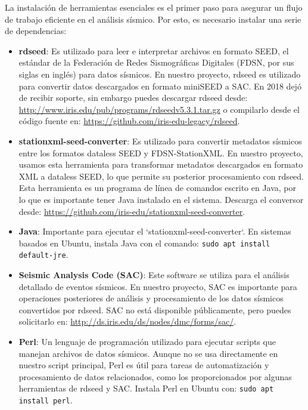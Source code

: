 \documentclass[a4paper,11pt]{refart}
\begin{document}
La instalación de herramientas esenciales es el primer paso para asegurar un flujo de trabajo eficiente en el análisis sísmico. Por esto, es necesario instalar una serie de dependencias:

\begin{itemize}
  \item \textbf{rdseed}: Es utilizado para leer e interpretar archivos en formato SEED, el estándar de la Federación de Redes Sismográficas Digitales (FDSN, por sus siglas en inglés) para datos sísmicos. En nuestro proyecto, rdseed es utilizado para convertir datos descargados en formato miniSEED a SAC. En 2018 dejó de recibir soporte, sin embargo puedes descargar rdseed desde: \url{http://www.iris.edu/pub/programs/rdseedv5.3.1.tar.gz} o compilarlo desde el código fuente en: \url{https://github.com/iris-edu-legacy/rdseed}.

  \item \textbf{stationxml-seed-converter}: Es utilizado para convertir metadatos sísmicos entre los formatos dataless SEED y FDSN-StationXML. En nuestro proyecto, usamos esta herramienta para transformar metadatos descargados en formato XML a dataless SEED, lo que permite su posterior procesamiento con rdseed. Esta herramienta es un programa de línea de comandos escrito en Java, por lo que es importante tener Java instalado en el sistema. Descarga el conversor desde: \url{https://github.com/iris-edu/stationxml-seed-converter}.

  \item \textbf{Java}: Importante para ejecutar el `stationxml-seed-converter`. En sistemas basados en Ubuntu, instala Java con el comando: \texttt{sudo apt install default-jre}.

  \item \textbf{Seismic Analysis Code (SAC)}: Este software se utiliza para el análisis detallado de eventos sísmicos. En nuestro proyecto, SAC es importante para operaciones posteriores de análisis y procesamiento de los datos sísmicos convertidos por rdseed. SAC no está disponible públicamente, pero puedes solicitarlo en: \url{http://ds.iris.edu/ds/nodes/dmc/forms/sac/}.

  \item \textbf{Perl}: Un lenguaje de programación utilizado para ejecutar scripts que manejan archivos de datos sísmicos. Aunque no se usa directamente en nuestro script principal, Perl es útil para tareas de automatización y procesamiento de datos relacionados, como los proporcionados por algunas herramientas de rdseed y SAC. Instala Perl en Ubuntu con: \texttt{sudo apt install perl}.
\end{itemize}
\end{document}
